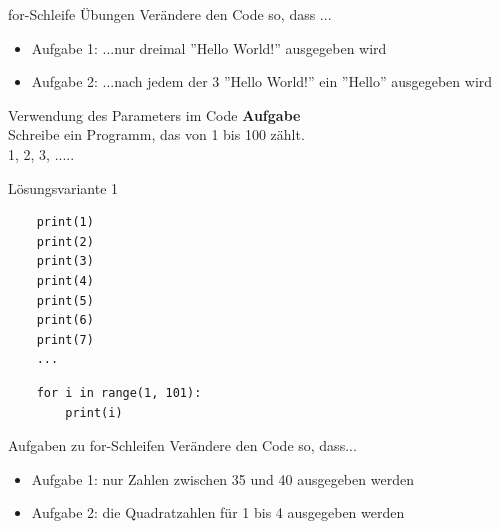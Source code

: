 \begin{frame}[fragile]{for-Schleife Übungen}
Verändere den Code so, dass ...
\begin{itemize}
\item Aufgabe 1: ...nur dreimal ''Hello World!'' ausgegeben wird\\
\item Aufgabe 2: ...nach jedem der 3 ''Hello World!'' ein ''Hello'' ausgegeben wird
\end{itemize}
\end{frame}


\begin{frame}[fragile]{Verwendung des Parameters im Code}
\textbf{Aufgabe}\\
    Schreibe ein Programm, das von 1 bis 100 zählt.\\
   1, 2, 3, .....

\begin{exampleblock}{Lösungsvariante 1}
    \begin{lstlisting}
	print(1)
	print(2)
	print(3)
	print(4)
	print(5)
	print(6)
	print(7)
	...
    \end{lstlisting}
    \pause{}
    \begin{lstlisting}
    for i in range(1, 101):
    	print(i)
    \end{lstlisting}
\end{exampleblock}
\end{frame}

\begin{frame}[fragile]{Aufgaben zu for-Schleifen}
Verändere den Code so, dass...
\begin{itemize}
	\item Aufgabe 1: nur Zahlen zwischen 35 und 40 ausgegeben werden
	\item Aufgabe 2: die Quadratzahlen für 1 bis 4 ausgegeben werden 
\end{itemize}
\end{frame}




